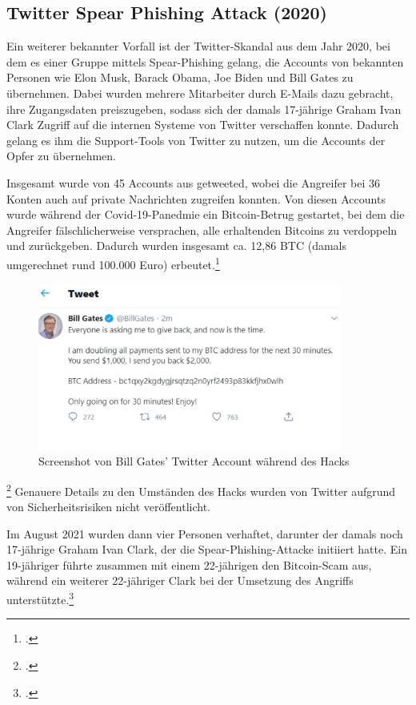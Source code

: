 \documentclass[12pt, a4paper, oneside]{scrartcl}
\begin{document}
\subsection{Twitter Spear Phishing Attack (2020)}

Ein weiterer bekannter Vorfall ist der Twitter-Skandal aus dem Jahr 2020, bei dem es einer Gruppe mittels Spear-Phishing gelang,
die Accounts von bekannten Personen wie Elon Musk, Barack Obama, Joe Biden und Bill Gates zu übernehmen.
Dabei wurden mehrere Mitarbeiter durch E-Mails dazu gebracht, ihre Zugangsdaten preiszugeben, sodass sich 
der damals 17-jährige Graham Ivan Clark Zugriff auf die internen Systeme von Twitter verschaffen konnte. Dadurch gelang
es ihm die Support-Tools von Twitter zu nutzen, um die Accounts der Opfer zu übernehmen. 
\par
Insgesamt wurde von 45 Accounts aus getweeted, wobei die Angreifer bei 36 Konten auch auf private Nachrichten zugreifen konnten. 
Von diesen Accounts wurde während der Covid-19-Panedmie ein Bitcoin-Betrug gestartet, bei dem die Angreifer fälschlicherweise versprachen, 
alle erhaltenden Bitcoins zu verdoppeln und zurückgeben. Dadurch wurden insgesamt ca. 12,86 BTC 
(damals umgerechnet rund 100.000 Euro) erbeutet.\footcite{teampw_TwitterPhishing}

\begin{figure}[h!]
  \centering
  \includegraphics[width=10cm]{bill_hack.png}
  \caption[Screenshot von Bill Gates' Twitter Account während des Hacks]{Screenshot von Bill Gates' Twitter Account während des Hacks\footnotemark}
\end{figure}
\footcitetext{PicTwitterHack}
Genauere Details zu den Umständen des Hacks wurden von Twitter aufgrund von Sicherheitsrisiken nicht veröffentlicht. 
\par
Im August 2021 wurden dann vier Personen verhaftet, darunter der damals noch 17-jährige Graham Ivan Clark, 
der die Spear-Phishing-Attacke initiiert hatte. Ein 19-jähriger führte zusammen mit einem 22-jährigen den 
Bitcoin-Scam aus, während ein weiterer 22-jähriger Clark bei der Umsetzung des Angriffs unterstützte.\footcite{teampw_TwitterPhishing}\\
\end{document}
